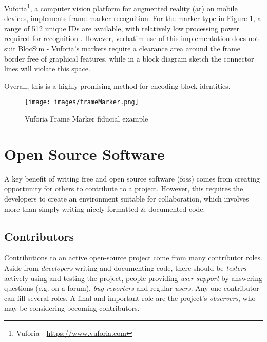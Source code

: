 Vuforia\footnote{Vuforia - \url{https://www.vuforia.com}}, a computer vision platform for augmented reality (\gls{ar}) on mobile devices, implements frame marker recognition. For the marker type in Figure \ref{im:frameMarker}, a range of 512 unique IDs are available, with relatively low processing power required for recognition \cite{vuforia}. However, verbatim use of this implementation does not suit BlocSim - Vuforia's markers require a clearance area around the frame border free of graphical features, while in a block diagram sketch the connector lines will violate this space.

Overall, this is a highly promising method for encoding block identities.

\begin{figure}[ht!]
\centering
\texttt{[image: images/frameMarker.png]}
\caption{Vuforia Frame Marker fiducial example \cite{vuforia}}
\label{im:frameMarker}
\end{figure}

\clearpage



\section{Open Source Software}

A key benefit of writing free and open source software (\gls{foss}) comes from creating opportunity for others to contribute to a project. However, this requires the developers to create an environment suitable for collaboration, which involves more than simply writing nicely formatted \& documented code.
\\

\subsection{Contributors}

Contributions to an active open-source project come from many contributor roles. Aside from \textit{developers} writing and documenting code, there should be \textit{testers} actively using and testing the project, people providing \textit{user support} by answering questions (e.g. on a forum), \textit{bug reporters} and regular \textit{users}. Any one contributor can fill several roles. A final and important role are the project's \textit{observers}, who may be considering becoming contributors.

